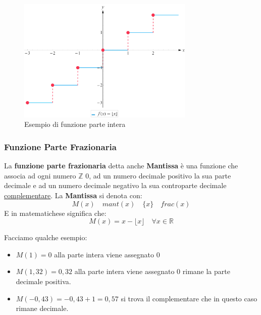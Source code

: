 \documentclass{article}
\theoremstyle{definition}
\begin{document}
\begin{figure}[h]
        \centering
                \includegraphics[width=0.75\textwidth]{esempio_funzione_parte_intera.png}
        \caption{Esempio di funzione parte intera}\label{fig:esempio_funzione_parte_intera}
\end{figure}


\subsubsection{Funzione Parte Frazionaria}\label{sec:funzione_parte_frazionaria}
La \textbf{funzione parte frazionaria} detta anche \textbf{Mantissa} è una funzione che associa ad ogni numero $ \mathbb{Z} $ 0, ad un numero decimale positivo la sua parte decimale e ad un numero decimale negativo la sua controparte decimale \underline{complementare}.
La \textbf{Mantissa} si denota con:
\begin{equation*}
        M(x) \quad mant(x) \quad \{x\} \quad frac(x) 
\end{equation*}
E in matematichese significa che:
\begin{equation*}
        M(x) = x - \lfloor x \rfloor \quad \forall x \in \mathbb{R}
\end{equation*}

Facciamo qualche esempio:
\begin{itemize}
        \item $ M(1) = 0 $ alla parte intera viene assegnato $ 0 $  
        \item $ M(1,32) = 0,32 $ alla parte intera viene assegnato $ 0 $ rimane la parte decimale positiva.
        \item $ M(-0,43) = -0,43 + 1 = 0,57 $ si trova il complementare che in questo caso rimane decimale. 
\end{itemize} 
\end{document}
